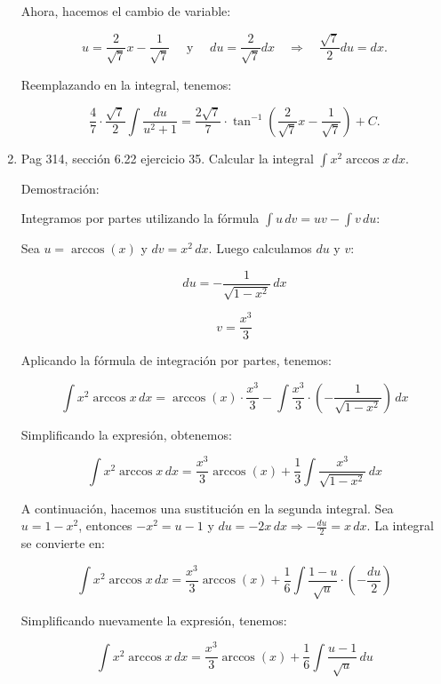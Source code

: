 \documentclass{report}
\begin{document}
\begin{enumerate}
        Ahora, hacemos el cambio de variable:
        
        \[
        u = \frac{2}{\sqrt{7}} x-\frac{1}{\sqrt{7}} \quad \text{ y } \quad du = \frac{2}{\sqrt{7}} dx \quad \Rightarrow \quad \frac{\sqrt{7}}{2} du = dx.
        \]
        
        Reemplazando en la integral, tenemos:
        
        \[
        \frac{4}{7} \cdot \frac{\sqrt{7}}{2} \int \frac{du}{u^2+1} = \frac{2\sqrt{7}}{7} \cdot \tan^{-1}\left(\frac{2}{\sqrt{7}} x-\frac{1}{\sqrt{7}}\right)+C.
        \]
        
        \item Pag 314, sección 6.22 ejercicio 35. Calcular la integral $\int x^2 \arccos x \, dx$.
        
        Demostración:
        
        Integramos por partes utilizando la fórmula $\int u \, dv = uv - \int v \, du$:
        
        Sea $u = \arccos(x)$ y $dv = x^2 \, dx$. Luego calculamos $du$ y $v$:
        
        \[ du = -\frac{1}{\sqrt{1-x^2}} \, dx \]
        
        \[ v = \frac{x^3}{3} \]
        
        Aplicando la fórmula de integración por partes, tenemos:
        
        \[ \int x^2 \arccos x \, dx = \arccos(x) \cdot \frac{x^3}{3} - \int \frac{x^3}{3} \cdot \left(-\frac{1}{\sqrt{1-x^2}}\right) \, dx \]
        
        Simplificando la expresión, obtenemos:
        
        \[ \int x^2 \arccos x \, dx = \frac{x^3}{3} \arccos(x) + \frac{1}{3} \int \frac{x^3}{\sqrt{1-x^2}} \, dx \]
        
        A continuación, hacemos una sustitución en la segunda integral. Sea $u = 1-x^2$, entonces $-x^2 = u-1$ y $du = -2x \, dx \Rightarrow -\frac{du}{2} = x \, dx$. La integral se convierte en:
        
        \[ \int x^2 \arccos x \, dx = \frac{x^3}{3} \arccos(x) + \frac{1}{6} \int \frac{1-u}{\sqrt{u}} \cdot \left(-\frac{du}{2}\right) \]
        
        Simplificando nuevamente la expresión, tenemos:
        
        \[ \int x^2 \arccos x \, dx = \frac{x^3}{3} \arccos(x) + \frac{1}{6} \int \frac{u-1}{\sqrt{u}} \, du \]
        

\end{enumerate}
\end{document}
